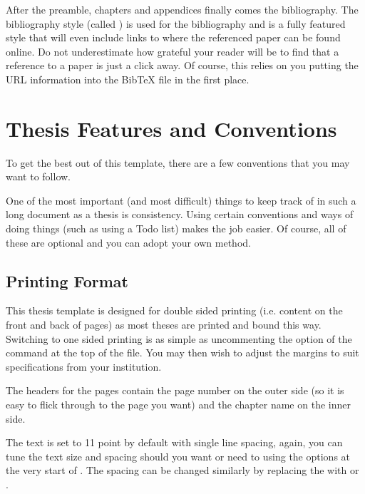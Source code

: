 After the preamble, chapters and appendices finally comes the bibliography. The bibliography style (called ) is used for the bibliography and is a fully featured style that will even include links to where the referenced paper can be found online. Do not underestimate how grateful your reader will be to find that a reference to a paper is just a click away. Of course, this relies on you putting the URL information into the BibTeX file in the first place.


\section{Thesis Features and Conventions}\label{ThesisConventions}

To get the best out of this template, there are a few conventions that you may want to follow.

One of the most important (and most difficult) things to keep track of in such a long document as a thesis is consistency. Using certain conventions and ways of doing things (such as using a Todo list) makes the job easier. Of course, all of these are optional and you can adopt your own method.

\subsection{Printing Format}

This thesis template is designed for double sided printing (i.e. content on the front and back of pages) as most theses are printed and bound this way. Switching to one sided printing is as simple as uncommenting the  option of the  command at the top of the  file. You may then wish to adjust the margins to suit specifications from your institution.

The headers for the pages contain the page number on the outer side (so it is easy to flick through to the page you want) and the chapter name on the inner side.

The text is set to 11 point by default with single line spacing, again, you can tune the text size and spacing should you want or need to using the options at the very start of . The spacing can be changed similarly by replacing the  with  or .

